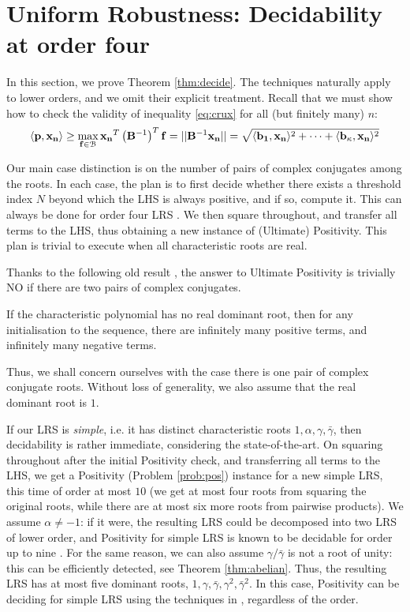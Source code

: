 \section{Uniform Robustness: Decidability at order four}
\label{section:decidability}
In this section, we prove Theorem \ref{thm:decide}. The techniques naturally apply to lower orders, and we omit their explicit treatment. Recall that we must show how to check the validity of inequality \ref{eq:crux} for all (but finitely many) $n$:
$$
\langle\mathbf{p}, \mathbf{x_n}\rangle \ge \max_{\mathbf{f} \in \mathcal{B}}\mathbf{x_n}^T\left(\mathbf{B}^{-1}\right)^T\mathbf{f} = ||\mathbf{B}^{-1}\mathbf{x_n}|| = \sqrt{\langle\mathbf{b_1}, \mathbf{x_n}\rangle^2 +\dots+\langle\mathbf{b_\kappa}, \mathbf{x_n}\rangle^2}
$$

Our main case distinction is on the number of pairs of complex conjugates among the roots. In each case, the plan is to first decide whether there exists a threshold index $N$ beyond which the LHS is always positive, and if so, compute it. This can always be done for order four LRS \cite{joeljames3}. We then square throughout, and transfer all terms to the LHS, thus obtaining a new instance of (Ultimate) Positivity. This plan is trivial to execute when all characteristic roots are real.

Thanks to the following old result \cite[Thm. 2]{positive-dominant}, the answer to Ultimate Positivity is trivially NO if there are two pairs of complex conjugates.

\begin{proposition}[Folklore]
\label{prop:folklore}
If the characteristic polynomial has no real dominant root, then for any initialisation to the sequence, there are infinitely many positive terms, and infinitely many negative terms.
\end{proposition}

Thus, we shall concern ourselves with the case there is one pair of complex conjugate roots. Without loss of generality, we also assume that the real dominant root is $1$. 

If our LRS is \textit{simple}, i.e. it has distinct characteristic roots $1, \alpha, \gamma, \bar{\gamma}$, then decidability is rather immediate, considering the state-of-the-art. On squaring throughout after the initial Positivity check, and transferring all terms to the LHS, we get a Positivity (Problem \ref{prob:pos}) instance for a new simple LRS, this time of order at most $10$ (we get at most four roots from squaring the original roots, while there are at most six more roots from pairwise products). We assume $\alpha \ne -1$: if it were, the resulting LRS could be decomposed into two LRS of lower order, and Positivity for simple LRS is known to be decidable for order up to nine \cite{ouaknine2014positivity}. For the same reason, we can also assume $\gamma/\bar{\gamma}$ is not a root of unity: this can be efficiently detected, see Theorem \ref{thm:abelian}. Thus, the resulting LRS has at most five dominant roots, $1, \gamma, \bar{\gamma}, \gamma^2, \bar{\gamma}^2$. In this case, Positivity can be deciding for simple LRS using the techniques in \cite{ouaknine2014positivity}, regardless of the order.

